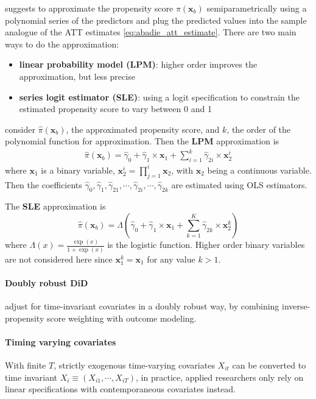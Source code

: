 \documentclass[twoside]{article}
\begin{document}
\citet{abadie2005semiparametric} suggests to approximate the propensity score $\pi\left(\mathbf{x}_b\right)$ semiparametrically using a polynomial series of the predictors and plug the predicted values into the sample analogue of the ATT estimates \ref{eq:abadie_att_estimate}.
There are two main ways to do the approximation:
\begin{itemize}
    \item \textbf{linear probability model (LPM)}: higher order improves the approximation, but less precise
    \item \textbf{series logit estimator (SLE)}: using a logit specification to constrain the estimated propensity score to vary between 0 and 1
\end{itemize}

consider $\hat{\pi}\left(\mathbf{x}_b\right)$, the approximated propensity score, and $k$, the order of the polynomial function for approximation. Then the \textbf{LPM} approximation is 
\begin{align*}
    \hat{\pi}\left(\mathbf{x}_b\right) = \hat{\gamma}_0 + \hat{\gamma}_1 \times \mathbf{x}_1 + \sum^k_{i=1}\hat{\gamma}_{2i}\times \mathbf{x}^i_2
\end{align*}
where $\mathbf{x}_1$ is a binary variable, $\mathbf{x}_2^i = \prod^i_{j=1}\mathbf{x}_2$, with $\mathbf{x}_2$ being a continuous variable. Then the coefficients $\hat{\gamma}_0,\hat{\gamma}_1,\hat{\gamma}_{21},\cdots,\hat{\gamma}_{2i},\cdots,\hat{\gamma}_{2k}$ are estimated using OLS estimators.

The \textbf{SLE} approximation is 
\begin{equation*}
    \hat{\pi}\left(\mathbf{x}_b\right) = \Lambda\left(\hat{\gamma}_0 + \hat{\gamma}_1\times \mathbf{x}_1 + \sum^K_{k=1}\hat{\gamma}_{2k}\times \mathbf{x}^k_2\right)
\end{equation*}
where $\Lambda(x) = \frac{\exp(x)}{1+\exp(x)}$ is the logistic function. Higher order binary variables are not considered here since $\mathbf{x}_1^k=\mathbf{x}_1$ for any value $k>1$.

\paragraph*{Doubly robust DiD} \citet{sant2020doubly} adjust for time-invariant covariates in a doubly robust way, by combining inverse-propensity score weighting with outcome modeling. 

\paragraph*{Timing varying covariates}
With finite $T$, strictly exogenous time-varying covariates $X_{it}$ can be converted to time invariant $X_i\equiv \left(X_{i1},\cdots,X_{iT}\right)$, in practice, applied researchers only rely on linear specifications with contemporaneous covariates instead.
\end{document}
